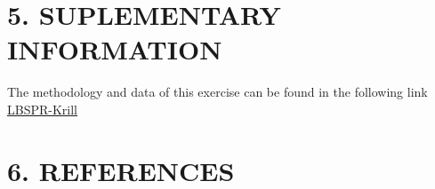 \documentclass[
]{article}
\begin{document}
\hypertarget{suplementary-information}{%
\section{5. SUPLEMENTARY INFORMATION}\label{suplementary-information}}

The methodology and data of this exercise can be found in the following
link \href{https://github.com/MauroMardones/LBSPR_Krill}{LBSPR-Krill}

\newpage

\hypertarget{references}{%
\section*{6. REFERENCES}\label{references}}

\hypertarget{refs}{}
\end{document}
